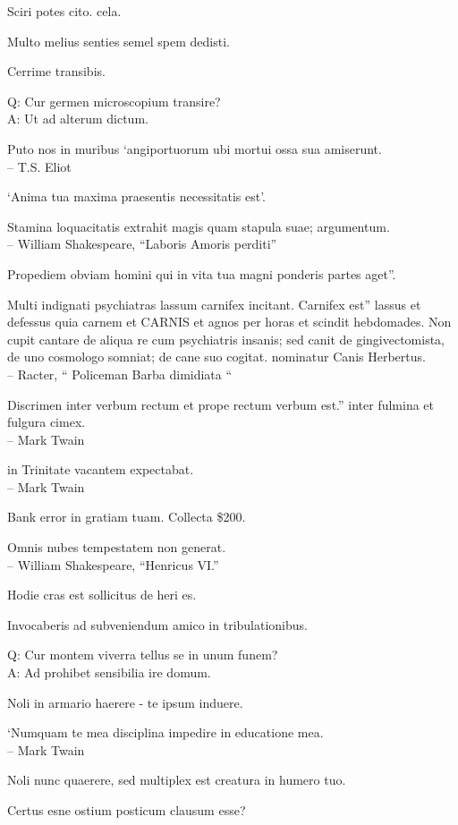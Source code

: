 \documentclass[titlepage,12pt]{memoir}
\begin{document}
Sciri potes cito. cela.

Multo melius senties semel spem dedisti.

Cerrime transibis.

Q: Cur germen microscopium transire?\\
A: Ut ad alterum dictum.

Puto nos in muribus ‘angiportuorum ubi mortui ossa sua amiserunt.
\\-- T.S. Eliot

‘Anima tua maxima praesentis necessitatis est’.

Stamina loquacitatis extrahit magis quam stapula suae;
argumentum.
\\-- William Shakespeare, “Laboris Amoris perditi”

Propediem obviam homini qui in vita tua magni ponderis partes aget”.

Multi indignati psychiatras lassum carnifex incitant. Carnifex est”
lassus et defessus quia carnem et CARNIS et agnos per horas et scindit
hebdomades. Non cupit cantare de aliqua re cum psychiatris insanis;
sed canit de gingivectomista, de uno cosmologo somniat;
de cane suo cogitat. nominatur Canis Herbertus.
\\-- Racter, “ Policeman Barba dimidiata “

Discrimen inter verbum rectum et prope rectum verbum est.”
inter fulmina et fulgura cimex.
\\-- Mark Twain

in Trinitate vacantem expectabat.
\\-- Mark Twain

Bank error in gratiam tuam. Collecta \$200.

Omnis nubes tempestatem non generat.
\\-- William Shakespeare, “Henricus VI.”

Hodie cras est sollicitus de heri es.

Invocaberis ad subveniendum amico in tribulationibus.

Q: Cur montem viverra tellus se in unum funem?\\
A: Ad prohibet sensibilia ire domum.

Noli in armario haerere - te ipsum induere.

‘Numquam te mea disciplina impedire in educatione mea.
\\-- Mark Twain

Noli nunc quaerere, sed multiplex est creatura in humero tuo.

 Certus esne ostium posticum clausum esse?
\end{document}

